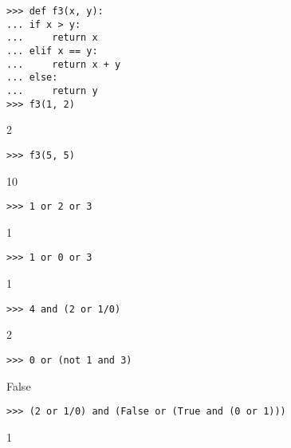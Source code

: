 \begin{lstlisting}
>>> def f3(x, y):
...	if x > y:
...		return x
...	elif x == y:
...		return x + y
...	else:
...		return y
>>> f3(1, 2)
\end{lstlisting}
\begin{solution}[.2in]
2
\end{solution}

\begin{lstlisting}
>>> f3(5, 5)
\end{lstlisting}
\begin{solution}[.2in]
10
\end{solution}

\begin{lstlisting}
>>> 1 or 2 or 3
\end{lstlisting}
\begin{solution}[.2in]
1
\end{solution}

\begin{lstlisting}
>>> 1 or 0 or 3
\end{lstlisting}
\begin{solution}[.2in]
1
\end{solution}

\begin{lstlisting}
>>> 4 and (2 or 1/0)
\end{lstlisting}
\begin{solution}[.2in]
2
\end{solution}

\begin{lstlisting}
>>> 0 or (not 1 and 3)
\end{lstlisting}
\begin{solution}[.2in]
False
\end{solution}

\begin{lstlisting}
>>> (2 or 1/0) and (False or (True and (0 or 1)))
\end{lstlisting}
\begin{solution}[.2in]
1
\end{solution}
